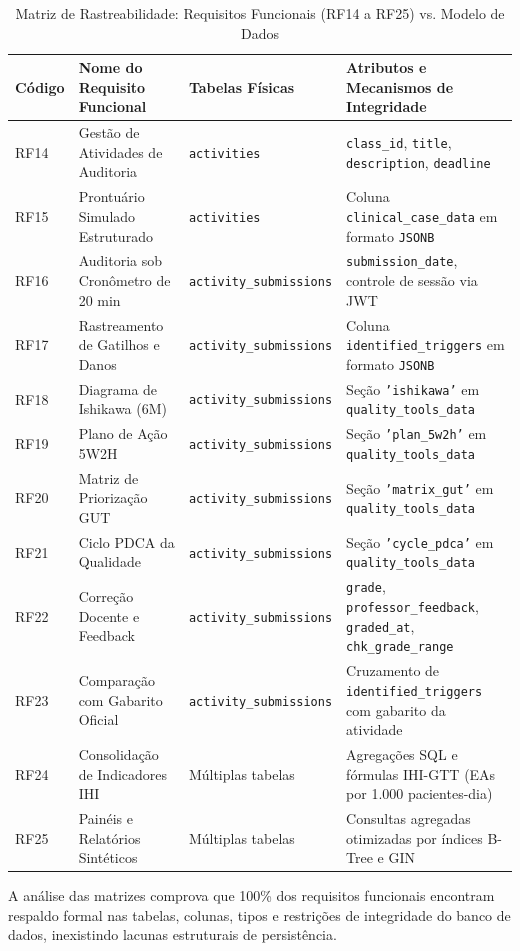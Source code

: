\begin{table}[!ht]
\centering
\caption{Matriz de Rastreabilidade: Requisitos Funcionais (RF14 a RF25) vs. Modelo de Dados}
\label{tab_rastreabilidade_dados_2}
\footnotesize
\begin{tabularx}{\textwidth}{p{1.2cm} p{3.8cm} p{3.8cm} X}
\toprule
\textbf{Código} & \textbf{Nome do Requisito Funcional} & \textbf{Tabelas Físicas} & \textbf{Atributos e Mecanismos de Integridade} \\
\midrule
RF14 & Gestão de Atividades de Auditoria & \texttt{activities} & \texttt{class\_id}, \texttt{title}, \texttt{description}, \texttt{deadline} \\
RF15 & Prontuário Simulado Estruturado & \texttt{activities} & Coluna \texttt{clinical\_case\_data} em formato \texttt{JSONB} \\
RF16 & Auditoria sob Cronômetro de 20 min & \texttt{activity\_submissions} & \texttt{submission\_date}, controle de sessão via JWT \\
RF17 & Rastreamento de Gatilhos e Danos & \texttt{activity\_submissions} & Coluna \texttt{identified\_triggers} em formato \texttt{JSONB} \\
RF18 & Diagrama de Ishikawa (6M) & \texttt{activity\_submissions} & Seção \texttt{'ishikawa'} em \texttt{quality\_tools\_data} \\
RF19 & Plano de Ação 5W2H & \texttt{activity\_submissions} & Seção \texttt{'plan\_5w2h'} em \texttt{quality\_tools\_data} \\
RF20 & Matriz de Priorização GUT & \texttt{activity\_submissions} & Seção \texttt{'matrix\_gut'} em \texttt{quality\_tools\_data} \\
RF21 & Ciclo PDCA da Qualidade & \texttt{activity\_submissions} & Seção \texttt{'cycle\_pdca'} em \texttt{quality\_tools\_data} \\
RF22 & Correção Docente e Feedback & \texttt{activity\_submissions} & \texttt{grade}, \texttt{professor\_feedback}, \texttt{graded\_at}, \texttt{chk\_grade\_range} \\
RF23 & Comparação com Gabarito Oficial & \texttt{activity\_submissions} & Cruzamento de \texttt{identified\_triggers} com gabarito da atividade \\
RF24 & Consolidação de Indicadores IHI & Múltiplas tabelas & Agregações SQL e fórmulas IHI-GTT (EAs por 1.000 pacientes-dia) \\
RF25 & Painéis e Relatórios Sintéticos & Múltiplas tabelas & Consultas agregadas otimizadas por índices B-Tree e GIN \\
\bottomrule
\end{tabularx}
\end{table}

A análise das matrizes comprova que 100\% dos requisitos funcionais encontram respaldo formal nas tabelas, colunas, tipos e restrições de integridade do banco de dados, inexistindo lacunas estruturais de persistência.

